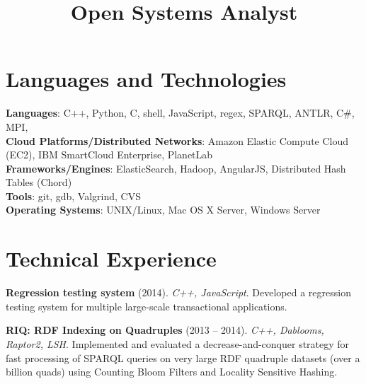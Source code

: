 \documentclass[margin,line]{resume}
\begin{document}
\begin{resume}
    \title{\textbf{Open Systems Analyst}}

    \begin{position}
    \vspace{-2mm}
    \end{position}

    \section{\mysidestyle Languages and Technologies} 

    \textbf{Languages}: C++, Python, C, shell, JavaScript, regex, SPARQL, ANTLR, C\#, MPI, \LaTeXe\\
    \textbf{Cloud Platforms/Distributed Networks}: Amazon Elastic Compute Cloud (EC2), IBM SmartCloud Enterprise, PlanetLab\\
    \textbf{Frameworks/Engines}: ElasticSearch, Hadoop, AngularJS, Distributed Hash Tables (Chord)\\
    \textbf{Tools}: git, gdb, Valgrind, CVS\\
    \textbf{Operating Systems}: {\sc UNIX}/Linux, Mac OS X Server, Windows Server
    
    \section{\mysidestyle Technical Experience}
    \textbf{Regression testing system} (2014). \textsl{C++, JavaScript}. Developed a regression testing system for multiple large-scale transactional applications.

    \vspace{-2mm}
    \textbf{RIQ: RDF Indexing on Quadruples} (2013 -- 2014). \textsl{C++, Dablooms, Raptor2, LSH}. Implemented and evaluated a decrease-and-conquer strategy for fast processing of SPARQL queries on very large RDF quadruple datasets  (over a billion quads) using Counting Bloom Filters and Locality Sensitive Hashing.
    

\end{resume}
\end{document}
